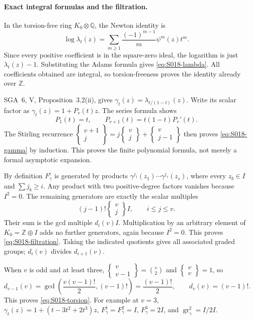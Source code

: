 \paragraph{Exact integral formulas and the filtration.}
In the torsion-free ring $K_0\otimes\mathbb Q$, the Newton identity is
\[
 \log\lambda_t(z)=\sum_{m\ge1}\frac{(-1)^{m-1}}m\psi^m(z)t^m.
\]
Since every positive coefficient is in the square-zero ideal,
the logarithm is just $\lambda_t(z)-1$. Substituting the Adams
formula gives \eqref{eq:S018-lambda}. All coefficients obtained
are integral, so torsion-freeness proves the identity already
over $\mathbb Z$.

SGA~6, V, Proposition~3.2(ii), gives
$\gamma_t(z)=\lambda_{t/(1-t)}(z)$. Write its scalar factor as
$\gamma_t(z)=1+P_v(t)z$. The series formula shows
\[
 P_1(t)=t,\qquad P_{v+1}(t)=t(1-t)P_v'(t).
\]
The Stirling recurrence
$\left\{\begin{smallmatrix}v+1\\j\end{smallmatrix}\right\}
=j\left\{\begin{smallmatrix}v\\j\end{smallmatrix}\right\}
+\left\{\begin{smallmatrix}v\\j-1\end{smallmatrix}\right\}$
then proves \eqref{eq:S018-gamma} by induction. This proves the
finite polynomial formula, not merely a formal asymptotic expansion.

By definition $F_\gamma^i$ is generated by products
$\gamma^{j_1}(z_1)\cdots\gamma^{j_s}(z_s)$, where every $z_b\in I$
and $\sum j_b\ge i$. Any product with two positive-degree factors
vanishes because $I^2=0$. The remaining generators are exactly
the scalar multiples
\[
 (j-1)!\left\{\begin{matrix}v\\j\end{matrix}\right\}I,
                         \qquad i\le j\le v.
\]
Their sum is the gcd multiple $d_i(v)I$. Multiplication by an
arbitrary element of $K_0=\mathbb Z\oplus I$ adds no further
generators, again because $I^2=0$. This proves
\eqref{eq:S018-filtration}. Taking the indicated quotients gives
all associated graded groups; $d_i(v)$ divides $d_{i+1}(v)$.

When $v$ is odd and at least three,
$\left\{\begin{smallmatrix}v\\v-1\end{smallmatrix}\right\}
=\binom v2$ and
$\left\{\begin{smallmatrix}v\\v\end{smallmatrix}\right\}=1$,
so
\[
 d_{v-1}(v)=\gcd\left(\frac{v(v-1)!}{2},(v-1)!\right)
                   =\frac{(v-1)!}{2},\qquad d_v(v)=(v-1)!.
\]
This proves \eqref{eq:S018-torsion}. For example at $v=3$,
$\gamma_t(z)=1+(t-3t^2+2t^3)z$,
$F_\gamma^1=F_\gamma^2=I$, $F_\gamma^3=2I$, and
$\operatorname{gr}_\gamma^2=I/2I$.

